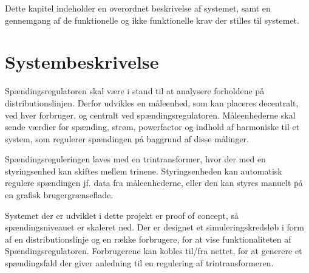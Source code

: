 
Dette kapitel indeholder en overordnet beskrivelse af systemet, samt en gennemgang af de funktionelle og ikke funktionelle krav der stilles til systemet. 

\section{Systembeskrivelse}
Spændingsregulatoren skal være i stand til at analysere forholdene på distributionslinjen. Derfor udvikles en måleenhed, som kan placeres decentralt, ved hver forbruger, og centralt ved spændingsregulatoren. Måleenhederne skal sende værdier for spænding, strøm, powerfactor og indhold af harmoniske til et system, som regulerer spændingen på baggrund af disse målinger. 

Spændingsreguleringen laves med en trintransformer, hvor der med en styringsenhed kan skiftes mellem trinene. Styringsenheden kan automatisk regulere spændingen jf. data fra måleenhederne, eller den kan styres manuelt på en grafisk brugergrænseflade. 

Systemet der er udviklet i dette projekt er proof of concept, så spændingsniveauet er skaleret ned.  Der er designet et simuleringskredsløb i form af en distributionslinje og en række forbrugere, for at vise funktionaliteten af Spændingsregulatoren. Forbrugerene  kan kobles til/fra nettet, for at generere et spændingsfald der giver anledning til en regulering af trintransformeren. 

